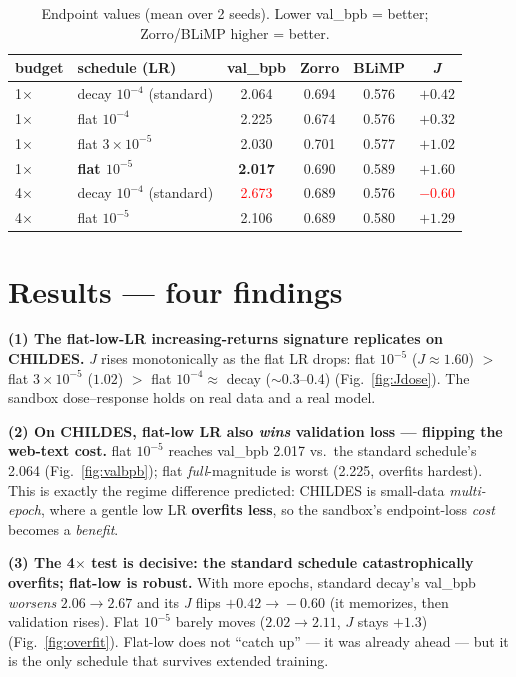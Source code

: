 \documentclass[11pt]{article}
\newcommand{\J}{\textit{J}}
\begin{document}
\begin{table}[h]\centering\small
\caption{Endpoint values (mean over 2 seeds). Lower val\_bpb = better; Zorro/BLiMP higher = better.}
\begin{tabular}{llcccc}
\toprule
budget & schedule (LR) & val\_bpb & Zorro & BLiMP & \J{} \\
\midrule
1$\times$ & decay $10^{-4}$ (standard) & 2.064 & 0.694 & 0.576 & $+0.42$ \\
1$\times$ & flat $10^{-4}$            & 2.225 & 0.674 & 0.576 & $+0.32$ \\
1$\times$ & flat $3\!\times\!10^{-5}$ & 2.030 & 0.701 & 0.577 & $+1.02$ \\
1$\times$ & \textbf{flat $10^{-5}$}   & \textbf{2.017} & 0.690 & 0.589 & $\mathbf{+1.60}$ \\
\midrule
4$\times$ & decay $10^{-4}$ (standard) & \textcolor{red}{2.673} & 0.689 & 0.576 & \textcolor{red}{$-0.60$} \\
4$\times$ & flat $10^{-5}$            & 2.106 & 0.689 & 0.580 & $+1.29$ \\
\bottomrule
\end{tabular}
\label{tab:end}
\end{table}

\section{Results --- four findings}
\textbf{(1) The flat-low-LR increasing-returns signature replicates on CHILDES.}
\J{} rises monotonically as the flat LR drops: flat $10^{-5}$ ($\J\!\approx\!1.60$) $>$ flat $3\!\times\!10^{-5}$
($1.02$) $>$ flat $10^{-4}\!\approx\!$ decay ($\sim$0.3--0.4) (Fig.~\ref{fig:Jdose}). The sandbox dose--response
holds on real data and a real model.

\textbf{(2) On CHILDES, flat-low LR also \emph{wins} validation loss --- flipping the web-text cost.}
flat $10^{-5}$ reaches val\_bpb 2.017 vs.\ the standard schedule's 2.064 (Fig.~\ref{fig:valbpb}); flat
\emph{full}-magnitude is worst (2.225, overfits hardest). This is exactly the regime difference predicted:
CHILDES is small-data \emph{multi-epoch}, where a gentle low LR \textbf{overfits less}, so the sandbox's
endpoint-loss \emph{cost} becomes a \emph{benefit}.

\textbf{(3) The 4$\times$ test is decisive: the standard schedule catastrophically overfits; flat-low is robust.}
With more epochs, standard decay's val\_bpb \emph{worsens} $2.06\!\to\!2.67$ and its \J{} flips
$+0.42\!\to\!-0.60$ (it memorizes, then validation rises). Flat $10^{-5}$ barely moves
($2.02\!\to\!2.11$, $\J$ stays $+1.3$) (Fig.~\ref{fig:overfit}). Flat-low does not ``catch up'' --- it was
already ahead --- but it is the only schedule that survives extended training.
\end{document}
